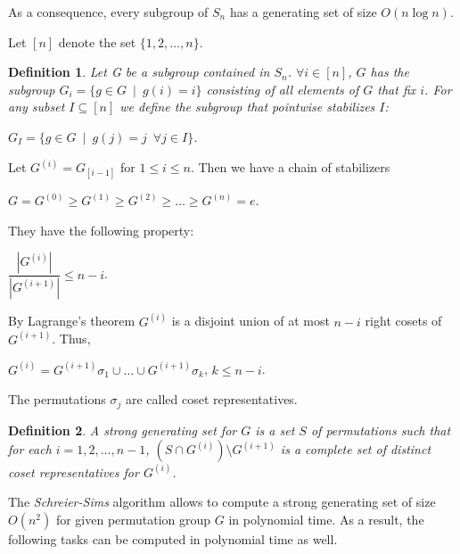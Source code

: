 \documentclass[12pt]{report}
\newcommand{\wsp}{\hspace{6pt}}
\newtheorem{definition}{Definition}[section]
\begin{document}
As a consequence, every subgroup of $S_n$ has a generating set of size $O(n \log n)$.\newline

Let $[n]$ denote the set $\{1, 2, \dots, n\}$.

\begin{definition}
	Let G be a subgroup contained in $S_n$. $\forall i \in [n]$, $G$ has the subgroup $G_i = \{g \in	G \wsp | \wsp g(i) = i\}$ consisting of all elements of $G$ that fix $i$. For any subset $I \subseteq [n]$ we define the subgroup that \textit{pointwise stabilizes $I$}:
	
	\begin{center}
		$G_I = \{ g \in G \wsp | \wsp g(j) = j \wsp \forall j \in I \}$.
	\end{center}
\end{definition}

Let $G^{(i)} = G_{[i-1]}$ for $1 \leq i \leq n$. Then we have a chain of stabilizers

\begin{center}
	$G = G^{(0)} \geq G^{(1)} \geq G^{(2)} \geq \dots \geq G^{(n)} = e$.
\end{center}

They have the following property:

\begin{center}
	$\dfrac{|G^{(i)}|}{|G^{(i+1)}|} \leq n - i$.
\end{center}

By Lagrange's theorem $G^{(i)}$ is a disjoint union of at most $n - i$ right cosets of $G^{(i+1)}$. Thus,

\begin{center}
	$G^{(i)} = G^{(i+1)} \sigma_1 \cup \dots \cup G^{(i+1)} \sigma_k$, $k \leq n-i$.
\end{center}

The permutations $\sigma_j$ are called coset representatives.

\begin{definition}
	A strong generating set for $G$ is a set $S$ of permutations such that for each $i = 1, 2, \dots, n-1$, $(S \cap G^{(i)}) \setminus G^{(i+1)}$ is a complete set of distinct coset representatives for $G^{(i)}$.
\end{definition}

The \textit{Schreier-Sims} algorithm allows to compute a strong generating set of size $O(n^2)$ for given permutation group $G$ in polynomial time. As a result, the following tasks can be computed in polynomial time as well.
\end{document}
